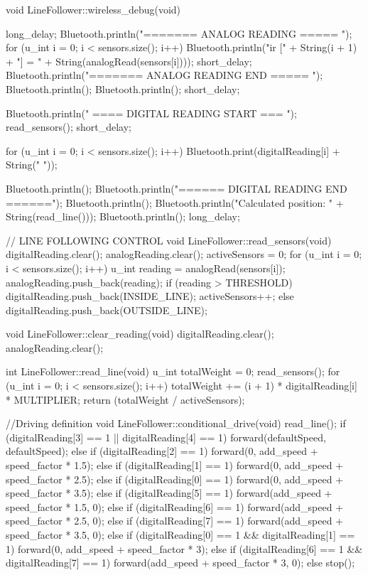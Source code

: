 \documentclass[14pt,a4paper]{extarticle}
\begin{document}
\begin{spverbatim}
void LineFollower::wireless_debug(void)
{
  long_delay;
  Bluetooth.println("======= ANALOG READING ===== ");
  for (u_int i = 0; i < sensors.size(); i++){
    Bluetooth.println("ir [" + String(i + 1) + "] = " + String(analogRead(sensors[i])));
    short_delay;
  }
  Bluetooth.println("======= ANALOG READING END ===== ");
  Bluetooth.println();
  Bluetooth.println();
  short_delay;

  Bluetooth.println(" ==== DIGITAL READING START === ");
  read_sensors();
  short_delay;
  
  for (u_int i = 0; i < sensors.size(); i++)
    Bluetooth.print(digitalReading[i] + String(" "));
    
  Bluetooth.println();
  Bluetooth.println("====== DIGITAL READING END ======");
  Bluetooth.println();
  Bluetooth.println("Calculated position: " + String(read_line()));
  Bluetooth.println();
  long_delay;
}

// LINE FOLLOWING CONTROL
void LineFollower::read_sensors(void)
{
  digitalReading.clear();
  analogReading.clear();
  activeSensors = 0;
  for (u_int i = 0; i < sensors.size(); i++) {
    u_int reading = analogRead(sensors[i]);
    analogReading.push_back(reading);
    if (reading > THRESHOLD){
      digitalReading.push_back(INSIDE_LINE);
      activeSensors++;
    }
    else
      digitalReading.push_back(OUTSIDE_LINE);
  }
}

void LineFollower::clear_reading(void)
{
  digitalReading.clear();
  analogReading.clear();
}

int LineFollower::read_line(void)
{
  u_int totalWeight = 0;
  read_sensors();
  for (u_int i = 0; i < sensors.size(); i++)
  {
    totalWeight += (i + 1) * digitalReading[i] * MULTIPLIER;
  }
  return (totalWeight / activeSensors);
}

//Driving definition
void LineFollower::conditional_drive(void)
{
  read_line();
  if (digitalReading[3] == 1 || digitalReading[4] == 1)
    forward(defaultSpeed, defaultSpeed);
  else if (digitalReading[2] == 1)
    forward(0, add_speed + speed_factor * 1.5);
  else if (digitalReading[1] == 1)
    forward(0, add_speed + speed_factor * 2.5);
  else if (digitalReading[0] == 1)
    forward(0, add_speed + speed_factor * 3.5);
  else if (digitalReading[5] == 1)
    forward(add_speed + speed_factor * 1.5, 0);
  else if (digitalReading[6] == 1)
    forward(add_speed + speed_factor * 2.5, 0);
  else if (digitalReading[7] == 1)
    forward(add_speed + speed_factor * 3.5, 0);
  else if (digitalReading[0] == 1 && digitalReading[1] == 1)
    forward(0, add_speed + speed_factor * 3);
  else if (digitalReading[6] == 1 && digitalReading[7] == 1)
    forward(add_speed + speed_factor * 3, 0);
  else stop();
}


\end{spverbatim}
\end{document}
